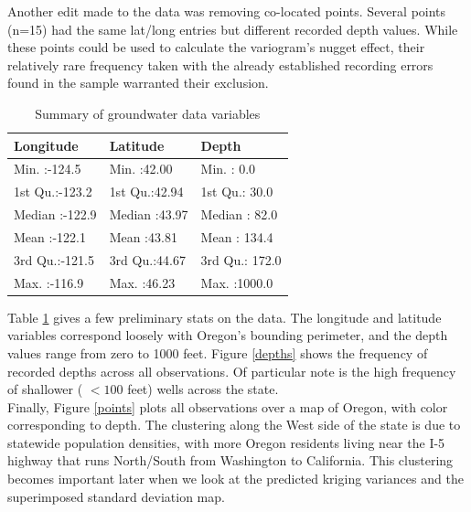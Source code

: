 \documentclass[12pt,twoside]{reedthesis}
\begin{document}
Another edit made to the data was removing co-located points. Several points (n=15) had the same lat/long entries but different recorded depth values. While these points could be used to calculate the variogram's nugget effect, their relatively rare frequency taken with the already established recording errors found in the sample warranted their exclusion. 

\begin{table}[h!]

	\centering
	

 \begin{tabular}{l|l|l}

\hline
 Longitude &       Latitude &     Depth\\
\hline
 Min.   :-124.5   & Min.   :42.00   & Min.   :   0.0  \\
\hline
 1st Qu.:-123.2   & 1st Qu.:42.94   & 1st Qu.:  30.0  \\
\hline
 Median :-122.9   & Median :43.97   & Median :  82.0  \\
\hline
 Mean   :-122.1   & Mean   :43.81   & Mean   : 134.4  \\
\hline
 3rd Qu.:-121.5   & 3rd Qu.:44.67   & 3rd Qu.: 172.0  \\
\hline
 Max.   :-116.9   & Max.   :46.23   & Max.   :1000.0  \\
\hline



\end{tabular}
\label{data}
\caption{Summary of groundwater data variables}

\end{table}

Table \ref{data} gives a few preliminary stats on the data. The longitude and latitude variables correspond loosely with Oregon's bounding perimeter, and the depth values range from zero to 1000 feet. Figure \ref{depths} shows the frequency of recorded depths across all observations. Of particular note is the high frequency of shallower ( $<100$ feet) wells across the state. \\

Finally, Figure \ref{points} plots all observations over a map of Oregon, with color corresponding to depth. The clustering along the West side of the state is due to statewide population densities, with more Oregon residents living near the I-5 highway that runs North/South from Washington to California. This clustering becomes important later when we look at the predicted kriging variances and the superimposed standard deviation map.
\end{document}
